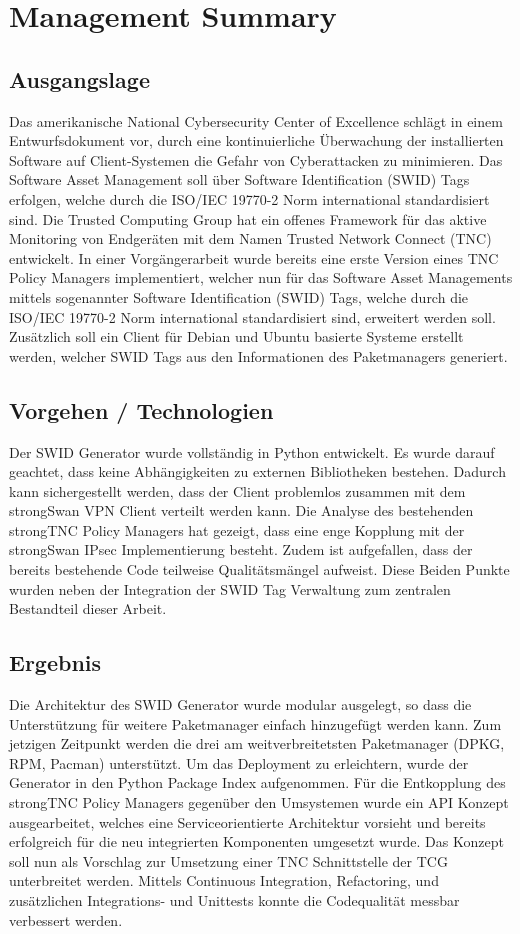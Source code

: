 \chapter{Management Summary}

\section{Ausgangslage}
Das amerikanische National Cybersecurity Center of Excellence schlägt in einem
Entwurfsdokument  vor, durch eine kontinuierliche Überwachung der installierten
Software auf Client-Systemen die Gefahr von Cyberattacken zu minimieren. Das
Software  Asset Management soll über Software Identification (SWID) Tags
erfolgen, welche durch die ISO/IEC 19770-2 Norm international
standardisiert sind. Die Trusted Computing Group hat ein offenes Framework für
das aktive Monitoring von Endgeräten  mit dem Namen Trusted Network Connect
(TNC) entwickelt. In einer Vorgängerarbeit wurde bereits eine erste Version
eines TNC Policy Managers implementiert, welcher nun für das Software Asset
Managements mittels sogenannter Software Identification (SWID) Tags, welche
durch die ISO/IEC 19770-2 Norm international standardisiert sind,
erweitert werden soll. Zusätzlich soll ein Client für Debian und Ubuntu basierte
Systeme erstellt werden, welcher SWID Tags aus den Informationen des
Paketmanagers generiert.

\section{Vorgehen / Technologien}
Der SWID Generator wurde vollständig in Python entwickelt. Es wurde darauf
geachtet, dass keine Abhängigkeiten zu externen Bibliotheken bestehen. Dadurch
kann sichergestellt werden, dass der Client problemlos zusammen mit dem
strongSwan VPN Client verteilt werden kann. Die Analyse des bestehenden
strongTNC Policy Managers hat gezeigt, dass eine enge Kopplung mit der
strongSwan IPsec Implementierung besteht. Zudem ist aufgefallen, dass der
bereits bestehende Code teilweise Qualitätsmängel aufweist. Diese Beiden Punkte
wurden neben der Integration der SWID Tag Verwaltung zum zentralen Bestandteil
dieser Arbeit.

\section{Ergebnis}
Die Architektur des SWID Generator wurde modular ausgelegt, so dass die
Unterstützung für weitere Paketmanager einfach hinzugefügt werden kann. Zum
jetzigen Zeitpunkt werden die drei am weitverbreitetsten Paketmanager (DPKG,
RPM, Pacman) unterstützt. Um das Deployment zu erleichtern, wurde  der Generator
in den Python Package Index aufgenommen. Für die Entkopplung des strongTNC
Policy Managers gegenüber den Umsystemen wurde ein API Konzept ausgearbeitet,
welches eine Serviceorientierte Architektur vorsieht und bereits erfolgreich für
die neu integrierten Komponenten umgesetzt wurde. Das Konzept soll nun als
Vorschlag zur Umsetzung einer TNC Schnittstelle der TCG unterbreitet werden.
Mittels Continuous Integration, Refactoring, und zusätzlichen Integrations- und
Unittests konnte die Codequalität messbar verbessert werden.

